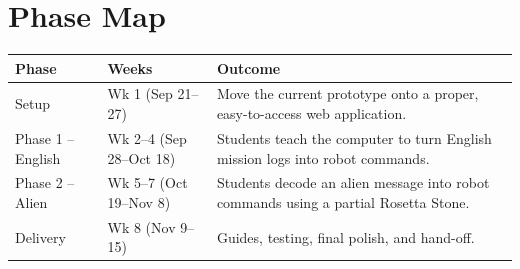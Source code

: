 \documentclass[a4]{article}
\begin{document}

\section{Phase Map}

\begin{center}
\renewcommand{\arraystretch}{1.3}
\begin{tabularx}{\linewidth}{@{}p{3.2cm}p{3.4cm}X@{}}
\toprule
\textbf{Phase} & \textbf{Weeks} & \textbf{Outcome} \\
\midrule
\cellcolor{phase0}Setup &
Wk 1 (Sep 21--27) &
Move the current prototype onto a proper, easy-to-access web application. \\

\cellcolor{phase1}Phase 1 -- English &
Wk 2--4 (Sep 28--Oct 18) &
Students teach the computer to turn English mission logs into robot commands. \\

\cellcolor{phase2}Phase 2 -- Alien &
Wk 5--7 (Oct 19--Nov 8) &
Students decode an alien message into robot commands using a partial Rosetta Stone. \\

\cellcolor{bufferc}Delivery &
Wk 8 (Nov 9--15) &
Guides, testing, final polish, and hand-off. \\
\bottomrule
\end{tabularx}
\end{center}
\end{document}
